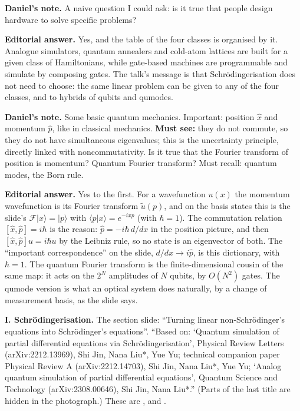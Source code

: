\medskip\noindent
{\bf Daniel's note.}
A naive question I could ask: is it true that
people design hardware to solve specific
problems?

\medskip\noindent
{\bf Editorial answer.}
Yes, and the table of the four classes is
organised by it. Analogue simulators, quantum
annealers and cold-atom lattices are built
for a given class of Hamiltonians, while
gate-based machines are programmable and
simulate by composing gates. The talk's
message is that Schr\"odingerisation does not
need to choose: the same linear problem can be
given to any of the four classes, and to
hybrids of qubits and qumodes.

\medskip\noindent
{\bf Daniel's note.}
Some basic quantum mechanics. Important:
position $\hat x$ and momentum $\hat p$, like
in classical mechanics. {\bf Must see:} they
do not commute, so they do not have
simultaneous eigenvalues; this is the
uncertainty principle, directly linked with
noncommutativity. Is it true that the Fourier
transform of position is momentum? Quantum
Fourier transform? Must recall: quantum
modes, the Born rule.

\medskip\noindent
{\bf Editorial answer.}
Yes to the first. For a wavefunction $u(x)$
the momentum wavefunction is its Fourier
transform $\tilde u(p)$, and on the basis
states this is the slide's
$\mathcal{F}|x\rangle=|p\rangle$ with
$\langle p|x\rangle=e^{-ixp}$ (with
$\hbar=1$). The commutation relation
$[\hat x,\hat p]=i\hbar$ is the reason:
$\hat p=-i\hbar\,d/dx$ in the position
picture, and then $[\hat x,\hat p]u=
i\hbar u$ by the Leibniz rule, so no state
is an eigenvector of both. The ``important
correspondence'' on the slide,
$d/dx\to i\hat p$, is this dictionary, with
$\hbar=1$. The quantum Fourier transform is the
finite-dimensional cousin of the same map: it
acts on the $2^N$ amplitudes of $N$ qubits,
by $O(N^2)$ gates. The qumode version is
what an optical system does naturally, by a
change of measurement basis, as the slide
says.

\medskip\noindent
{\bf I. Schr\"odingerisation.}
The section slide: ``Turning linear
non-Schr\"odinger's equations into
Schr\"odinger's equations''. ``Based on:
`Quantum simulation of partial differential
equations via Schr\"odingerisation',
Physical Review Letters (arXiv:2212.13969),
Shi Jin, Nana Liu*, Yue Yu; technical
companion paper Physical Review A
(arXiv:2212.14703), Shi Jin, Nana Liu*, Yue
Yu; `Analog quantum simulation of partial
differential equations', Quantum Science and
Technology (arXiv:2308.00646), Shi Jin, Nana
Liu*.'' (Parts of the last title are hidden in
the photograph.) These are \cite{jly-prl},
\cite{jly-pra} and \cite{jl-analog}.

